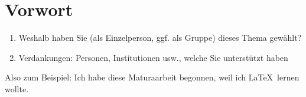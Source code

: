 \chapter{Vorwort}\label{chap:vorwort}
\begin{enumerate}
\item Weshalb haben Sie (als Einzelperson, ggf. als Gruppe) dieses Thema gewählt?
\item Verdankungen: Personen, Institutionen usw., welche Sie unterstützt haben
\end{enumerate}
Also zum Beispiel: Ich habe diese Maturaarbeit begonnen, weil ich \LaTeX\ lernen wollte.
\newpage